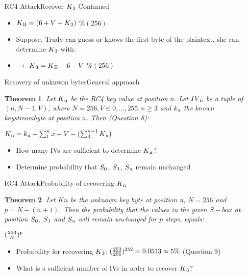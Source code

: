 \documentclass[
	aspectratio=169,	%
	onlytextwidth,		%
	t					%
	]{beamer}
\newtheorem{thm}{Theorem}
\begin{document}
\begin{frame}[fragile]{RC4 Attack}{Recover $K\textsubscript{3}$ Continued}

	\begin{itemize}
		\item $K\textsubscript{B} = (6 + V + K\textsubscript{3})$ $\% (256)$
		\item Suppose, Trudy can guess or knows the first byte of the plaintext, she can determine $K\textsubscript{3}$ with:
		\item $\rightarrow$ $K\textsubscript{3}  = K\textsubscript{B} - 6 - V$ $\% (256)$
	\end{itemize}
\end{frame}

\begin{frame}[fragile]{Recovery of unknwon bytes}{General approach} 
	\begin{thm}
		Let $ K\textsubscript{n} $ be the RC4 key value at position $ n $. Let $ IV\textsubscript{n} $ be a tuple of $ (n, N-1, V) $,
		where $ N = 256, V \in {{0,\dots,255}}, n \geq 3 $ and $ k\textsubscript{n} $ the known keystreambyte at position $n$. Then (Question 8): \\
		\begin{center}
			$K\textsubscript{n} = k\textsubscript{n} - \sum_{1}^{n}x - V - (\sum_{3}^{n-1}K\textsubscript{n})$
		\end{center}
	\end{thm} 
	\begin{itemize}
		\item How many IVs are sufficient to determine $ K\textsubscript{n} $?
		\item Determine probability that $ S\textsubscript{0}$, $S\textsubscript{1}$, $S\textsubscript{n} $ remain unchanged
	\end{itemize}
\end{frame}

\begin{frame}[fragile]{RC4 Attack}{Probability of recovering $K\textsubscript{n}$}
	\begin{thm}
		Let $Kn$ be the unknown key byte at position n, $N=256$ and $p = N-(n+1)$. Then the probability that the values in the given $S-box$ at position $S\textsubscript{0}$,
		$S\textsubscript{1}$ and $S\textsubscript{n}$ will remain unchanged for $p$ steps, equals:\\
		\begin{center}
			$(\frac{253}{N})\textsuperscript{p}$
		\end{center}
	\end{thm} 
	\begin{itemize}
		\item Probability for recovering $K\textsubscript{3}$: $(\frac{253}{256})\textsuperscript{252} = 0.0513 \approx 5\%$ (Question 9)
		\item What is a sufficient number of IVs in order to recover $K\textsubscript{3}$?
	\end{itemize}
\end{frame}
\end{document}
